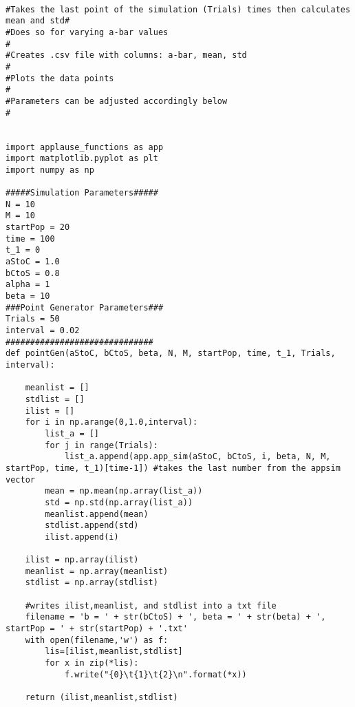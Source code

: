 \begin{lstlisting}

#Takes the last point of the simulation (Trials) times then calculates mean and std#
#Does so for varying a-bar values                                                  #
#Creates .csv file with columns: a-bar, mean, std                                  #
#Plots the data points                                                             #
#Parameters can be adjusted accordingly below                                      #


import applause_functions as app
import matplotlib.pyplot as plt
import numpy as np

#####Simulation Parameters#####
N = 10
M = 10
startPop = 20
time = 100
t_1 = 0
aStoC = 1.0
bCtoS = 0.8 
alpha = 1
beta = 10
###Point Generator Parameters###
Trials = 50
interval = 0.02
##############################
def pointGen(aStoC, bCtoS, beta, N, M, startPop, time, t_1, Trials, interval):
    
    meanlist = []
    stdlist = []
    ilist = []
    for i in np.arange(0,1.0,interval):
        list_a = []
        for j in range(Trials):
            list_a.append(app.app_sim(aStoC, bCtoS, i, beta, N, M, startPop, time, t_1)[time-1]) #takes the last number from the appsim vector
        mean = np.mean(np.array(list_a))
        std = np.std(np.array(list_a))  
        meanlist.append(mean)
        stdlist.append(std)
        ilist.append(i)

    ilist = np.array(ilist)
    meanlist = np.array(meanlist)
    stdlist = np.array(stdlist)
    
    #writes ilist,meanlist, and stdlist into a txt file
    filename = 'b = ' + str(bCtoS) + ', beta = ' + str(beta) + ', startPop = ' + str(startPop) + '.txt'    
    with open(filename,'w') as f:
        lis=[ilist,meanlist,stdlist]
        for x in zip(*lis):
            f.write("{0}\t{1}\t{2}\n".format(*x))
            
    return (ilist,meanlist,stdlist)
\end{lstlisting}